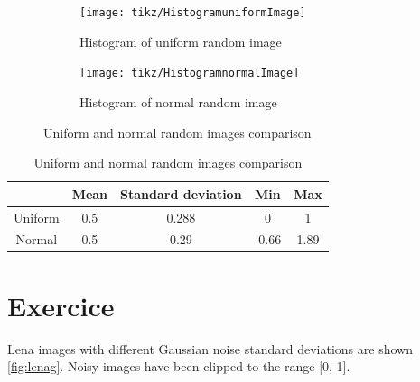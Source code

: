 \documentclass[12pt,english]{article}
\renewcommand{\thesection}{Exercice~\arabic{section}}
\begin{document}
\begin{figure}
	\begin{subfigure}[t]{0.4\textwidth}
		\centering
		\texttt{[image: tikz/HistogramuniformImage]}
		\caption{Histogram of uniform random image}
		\label{fig:unih}
	\end{subfigure}%
	\qquad
	\begin{subfigure}[t]{0.4\textwidth}
		\centering
		\texttt{[image: tikz/HistogramnormalImage]}
		\caption{Histogram of normal random image}
		\label{fig:normh}
	\end{subfigure}
	
	\caption{Uniform and normal random images comparison}
	\label{fig:uninorm}
\end{figure}

\begin{table}
	\centering
	\begin{tabular}{|c|c|c|c|c|}
		\hline
		& Mean & Standard deviation & Min & Max\\\hline
		Uniform & 0.5 & 0.288 & 0 & 1 \\\hline
		Normal & 0.5 & 0.29 & -0.66 & 1.89\\\hline
	\end{tabular}
	\caption{Uniform and normal random images comparison}
	\label{tab:uninorm}
\end{table}

\section[]{\thesection}
Lena images with different Gaussian noise standard deviations are shown \autoref{fig:lenag}. Noisy images have been clipped to the range [0, 1].
\end{document}
